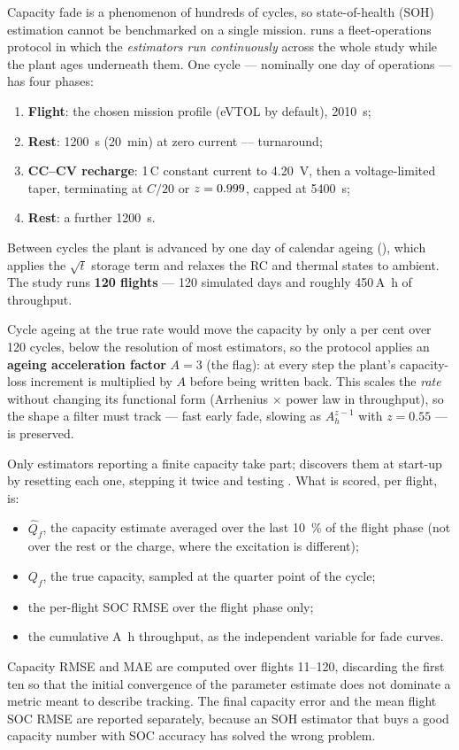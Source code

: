 Capacity fade is a phenomenon of hundreds of cycles, so state-of-health (SOH) estimation cannot be
benchmarked on a single mission.  runs a fleet-operations protocol in which the
\emph{estimators run continuously} across the whole study while the plant ages underneath them. One
cycle --- nominally one day of operations --- has four phases:
\begin{enumerate}[leftmargin=*,topsep=2pt,itemsep=1pt]
\item \textbf{Flight}: the chosen mission profile (eVTOL by default), \SI{2010}{\second};
\item \textbf{Rest}: \SI{1200}{\second} (\SI{20}{\minute}) at zero current --- turnaround;
\item \textbf{CC--CV recharge}: 1\,C constant current to \SI{4.20}{\volt}, then a
voltage-limited taper, terminating at $C/20$ or $z=0.999$, capped at \SI{5400}{\second};
\item \textbf{Rest}: a further \SI{1200}{\second}.
\end{enumerate}
Between cycles the plant is advanced by one day of calendar ageing (), which
applies the $\sqrt{t}$ storage term and relaxes the RC and thermal states to ambient. The study runs
\textbf{120 flights} --- 120 simulated days and roughly \num{450}\,\si{\ampere\hour} of throughput.

Cycle ageing at the true rate would move the capacity by only a per cent over 120 cycles, below the
resolution of most estimators, so the protocol applies an \textbf{ageing acceleration factor} $A=3$
(the  flag): at every step the plant's capacity-loss increment is multiplied by $A$
before being written back. This scales the \emph{rate} without changing its functional form
(Arrhenius $\times$ power law in throughput), so the shape a filter must track --- fast early fade,
slowing as $A_h^{z-1}$ with $z=0.55$ --- is preserved.

Only estimators reporting a finite capacity take part;  discovers them at start-up
by resetting each one, stepping it twice and testing . What is scored, per
flight, is:
\begin{itemize}[leftmargin=*,topsep=2pt,itemsep=1pt]
\item $\hat Q_f$, the capacity estimate averaged over the last \SI{10}{\percent} of the flight
phase (not over the rest or the charge, where the excitation is different);
\item $Q_f$, the true capacity, sampled at the quarter point of the cycle;
\item the per-flight SOC RMSE over the flight phase only;
\item the cumulative \si{\ampere\hour} throughput, as the independent variable for fade curves.
\end{itemize}
Capacity RMSE and MAE are computed over flights \numrange{11}{120}, discarding the first ten so that
the initial convergence of the parameter estimate does not dominate a metric meant to describe
tracking. The final capacity error and the mean flight SOC RMSE are reported separately, because an
SOH estimator that buys a good capacity number with SOC accuracy has solved the wrong problem.

